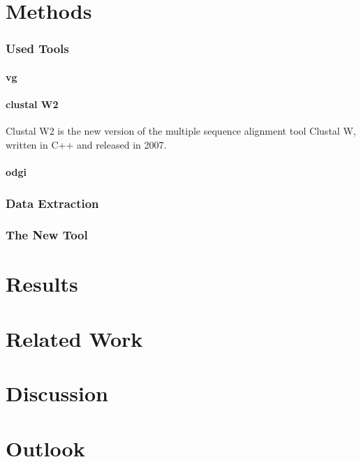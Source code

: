 \documentclass[a4paper,11pt,twoside,openright]{report}
\begin{document}
%
\chapter{Methods}

\subsection{Used Tools}
\subsubsection{vg}
\subsubsection{clustal W2}
Clustal W2 is the new version of the multiple sequence alignment tool Clustal W, written in C++ and released in 2007.

\subsubsection{odgi}

\subsection{Data Extraction}

\subsection{The New Tool}

%
\chapter{Results}

%
\chapter{Related Work}

%
\chapter{Discussion}

%
\chapter{Outlook}
\end{document}
